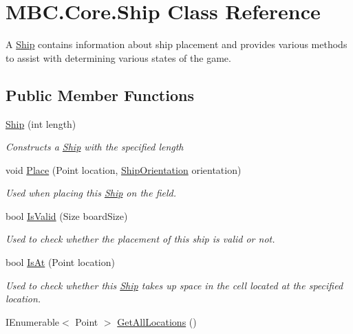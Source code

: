 \hypertarget{class_m_b_c_1_1_core_1_1_ship}{\section{M\-B\-C.\-Core.\-Ship Class Reference}
\label{class_m_b_c_1_1_core_1_1_ship}
}


A \hyperlink{class_m_b_c_1_1_core_1_1_ship}{Ship} contains information about ship placement and provides various methods to assist with determining various states of the game.  


\subsection*{Public Member Functions}
\begin{DoxyCompactItemize}
\item 
\hyperlink{class_m_b_c_1_1_core_1_1_ship_a2728c2c36920b0b340de375008a22eff}{Ship} (int length)
\begin{DoxyCompactList}\small\item\em Constructs a \hyperlink{class_m_b_c_1_1_core_1_1_ship}{Ship} with the specified length\end{DoxyCompactList}\item 
void \hyperlink{class_m_b_c_1_1_core_1_1_ship_a89511a2e24a6ce6f3346a685f6c20b7a}{Place} (Point location, \hyperlink{namespace_m_b_c_1_1_core_ae989f577ccd976664aa442c2cda4d12f}{Ship\-Orientation} orientation)
\begin{DoxyCompactList}\small\item\em Used when placing this \hyperlink{class_m_b_c_1_1_core_1_1_ship}{Ship} on the field.\end{DoxyCompactList}\item 
bool \hyperlink{class_m_b_c_1_1_core_1_1_ship_afbae95e084d6daeafea95e6c246b0fd4}{Is\-Valid} (Size board\-Size)
\begin{DoxyCompactList}\small\item\em Used to check whether the placement of this ship is valid or not.\end{DoxyCompactList}\item 
bool \hyperlink{class_m_b_c_1_1_core_1_1_ship_a1adf09a6c7bead42ffb4b478bd69ff1b}{Is\-At} (Point location)
\begin{DoxyCompactList}\small\item\em Used to check whether this \hyperlink{class_m_b_c_1_1_core_1_1_ship}{Ship} takes up space in the cell located at the specified location.\end{DoxyCompactList}\item 
\hypertarget{class_m_b_c_1_1_core_1_1_ship_ad65098b265e9fa64b8fcbe5a298b2041}{I\-Enumerable$<$ Point $>$ \hyperlink{class_m_b_c_1_1_core_1_1_ship_ad65098b265e9fa64b8fcbe5a298b2041}{Get\-All\-Locations} ()}\label{class_m_b_c_1_1_core_1_1_ship_ad65098b265e9fa64b8fcbe5a298b2041}


\end{DoxyCompactItemize}
